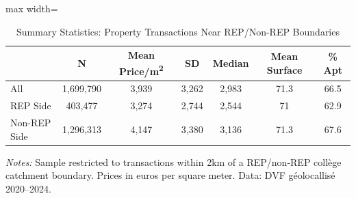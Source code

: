\begin{table}[htbp]
\centering
\caption{Summary Statistics: Property Transactions Near REP/Non-REP Boundaries}
\label{tab:summary}
\begin{adjustbox}{max width=\textwidth}
\begin{tabular}{lcccccc}
\toprule
 & N & Mean Price/m\textsuperscript{2} & SD & Median & Mean Surface & \% Apt \\
\midrule
All & 1,699,790 & 3,939 & 3,262 & 2,983 & 71.3 & 66.5 \\
REP Side & 403,477 & 3,274 & 2,744 & 2,544 & 71 & 62.9 \\
Non-REP Side & 1,296,313 & 4,147 & 3,380 & 3,136 & 71.3 & 67.6 \\
\bottomrule
\end{tabular}
\end{adjustbox}
\begin{tablenotes}
\small
\item \textit{Notes:} Sample restricted to transactions within 2km of a REP/non-REP coll\`ege catchment boundary. Prices in euros per square meter. Data: DVF g\'eolocallis\'e 2020--2024.
\end{tablenotes}
\end{table}

